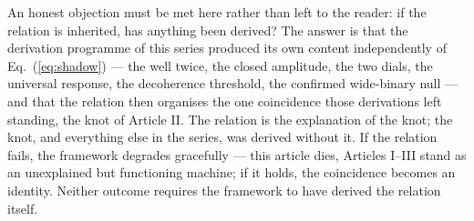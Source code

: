 An honest objection must be met here rather than left to the reader: if the relation is inherited, has anything been derived? The answer is that the derivation programme of this series produced its own content independently of Eq.~(\ref{eq:shadow}) --- the well twice, the closed amplitude, the two dials, the universal response, the decoherence threshold, the confirmed wide-binary null --- and that the relation then organises the one coincidence those derivations left standing, the knot of Article II. The relation is the explanation of the knot; the knot, and everything else in the series, was derived without it. If the relation fails, the framework degrades gracefully --- this article dies, Articles I--III stand as an unexplained but functioning machine; if it holds, the coincidence becomes an identity. Neither outcome requires the framework to have derived the relation itself.

